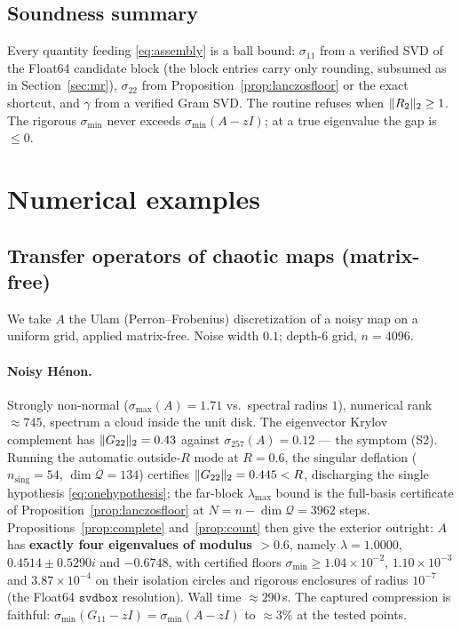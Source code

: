 \documentclass[11pt]{article}
\newcommand{\sig}{\sigma}
\newcommand{\sigmin}{\sigma_{\min}}
\newcommand{\sigmax}{\sigma_{\max}}
\DeclarePairedDelimiter{\norm}{\lVert}{\rVert}
\newcommand{\svdbox}{\texttt{svdbox}}
\begin{document}
\subsection{Soundness summary}\label{sec:sound}

Every quantity feeding \eqref{eq:assembly} is a ball bound: $\sig_{11}$ from a verified SVD of the
Float64 candidate block (the block entries carry only rounding, subsumed as in Section~\ref{sec:mr}),
$\sig_{22}$ from Proposition~\ref{prop:lanczosfloor} or the exact shortcut, and $\gamma$ from a verified
Gram SVD. The routine refuses when $\norm{R_2}_2\ge1$. The rigorous $\sigmin$ never exceeds
$\sigmin(A-zI)$; at a true eigenvalue the gap is $\le0$.

\section{Numerical examples}\label{sec:examples}

\subsection{Transfer operators of chaotic maps (matrix-free)}

We take $A$ the Ulam (Perron--Frobenius) discretization of a noisy map on a uniform grid, applied
matrix-free. Noise width $0.1$; depth-$6$ grid, $n=4096$.

\paragraph{Noisy H\'enon.} Strongly non-normal ($\sigmax(A)=1.71$ vs.\ spectral radius $1$), numerical
rank $\approx745$, spectrum a cloud inside the unit disk. The eigenvector Krylov complement has
$\norm{G_{22}}_2=0.43$ against $\sigma_{257}(A)=0.12$ --- the symptom (S2). Running the automatic
outside-$R$ mode at $R=0.6$, the singular deflation ($n_{\mathrm{sing}}=54$, $\dim\mathcal Q=134$)
certifies $\norm{G_{22}}_2=0.445<R$, discharging the single hypothesis
\eqref{eq:onehypothesis}; the far-block $\lambda_{\max}$ bound is the full-basis certificate of
Proposition~\ref{prop:lanczosfloor} at $N=n-\dim\mathcal Q=3962$ steps. Propositions~\ref{prop:complete}
and~\ref{prop:count} then give the exterior outright: $A$ has \textbf{exactly four eigenvalues of
modulus $>0.6$}, namely $\lambda=1.0000$, $0.4514\pm0.5290i$ and $-0.6748$, with certified floors
$\sigmin\ge1.04\!\times\!10^{-2}$, $1.10\!\times\!10^{-3}$ and $3.87\!\times\!10^{-4}$ on their
isolation circles and rigorous enclosures of radius $10^{-7}$ (the Float64 $\svdbox$ resolution).
Wall time $\approx290$\,s. The captured compression is faithful: $\sigmin(G_{11}-zI)=\sigmin(A-zI)$ to
$\approx3\%$ at the tested points.
\end{document}
